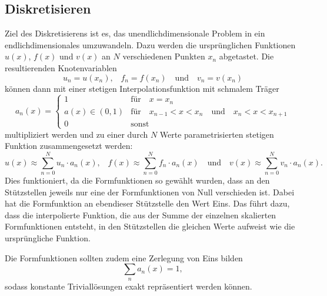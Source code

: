 \subsection{Diskretisieren\label{fem:1d:diskretisieren}}
Ziel des Diskretisierens ist es, das unendlichdimensionale Problem in ein endlichdimensionales umzuwandeln.
Dazu werden die ursprünglichen Funktionen $u(x)$, $f(x)$ und $v(x)$ an $N$ verschiedenen Punkten $x_n$ abgetastet.
Die resultierenden Knotenvariablen
\begin{equation}
    u_n = u(x_n) 
    \text{,} \quad
    f_n = f(x_n)
    \quad \text{und} \quad
    v_n = v(x_n)
\end{equation}
können dann mit einer stetigen Interpolationsfunktion mit schmalem Träger
\begin{equation}
    a_n(x) = \left\{ \begin{array}{ll}
        1
            & \text{für} \quad x = x_n \\
        a(x) \in (0, 1) 
            & \text{für} \quad x_{n-1} < x < x_n \quad \text{und} \quad x_n < x < x_{n+1} \\
        0
            & \text{sonst} 
    \end{array} \right.
\end{equation}
multipliziert werden und zu einer durch $N$ Werte parametrisierten stetigen Funktion zusammengesetzt werden:
\begin{equation}
    u(x) \approx \sum_{n=0}^{N}{u_n \cdot a_n(x)} 
    \text{,} \quad
    f(x) \approx \sum_{n=0}^{N}{f_n \cdot a_n(x)} 
    \quad \text{und} \quad
    v(x) \approx \sum_{n=0}^{N}{v_n \cdot a_n(x)}.
\end{equation}
Dies funktioniert, da die Formfunktionen so gewählt wurden, dass an den Stützstellen jeweils nur eine der Formfunktionen von Null verschieden ist.
Dabei hat die Formfunktion an ebendieser Stützstelle den Wert Eins.
Das führt dazu, dass die interpolierte Funktion, die aus der Summe der einzelnen skalierten Formfunktionen entsteht, in den Stützstellen die gleichen Werte aufweist wie die ursprüngliche Funktion.

Die Formfunktionen sollten zudem eine Zerlegung von Eins bilden
\begin{equation}
    \sum_{n} a_n(x) = 1, \label{fem:1d:zerlegung_v_eins}
\end{equation}
sodass konstante Triviallösungen exakt repräsentiert werden können.

